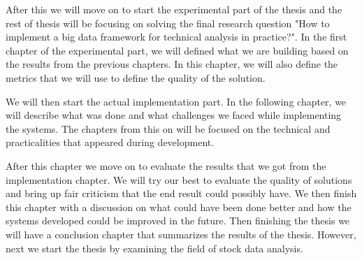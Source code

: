 After this we will move on to start the experimental part of the thesis and the rest of thesis will be focusing on solving the final research question "How to implement a big data framework for technical analysis in practice?".
In the first chapter of the experimental part, we will defined what we are building based on the results from the previous chapters.
In this chapter, we will also define the metrics that we will use to define the quality of the solution.

We will then start the actual implementation part.
In the following chapter, we will describe what was done and what challenges we faced while implementing the systems.
The chapters from this on will be focused on the technical and practicalities that appeared during development.

After this chapter we move on to evaluate the results that we got from the implementation chapter. 
We will try our best to evaluate the quality of solutions and bring up fair criticism that the end result could possibly have.
We then finish this chapter with a discussion on what could have been done better and how the systems developed could be improved in the future.
Then finishing the thesis we will have a conclusion chapter that summarizes the results of the thesis.
However, next we start the thesis by examining the field of stock data analysis.
